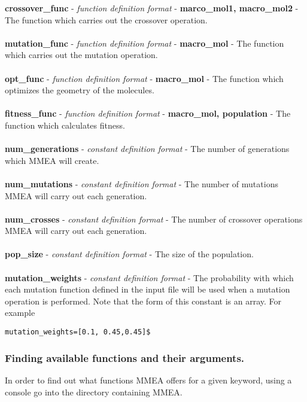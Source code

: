 \documentclass[12pt]{article}
\begin{document}
\textbf{crossover\_func} - \textit{function definition format} - \textbf{marco\_mol1, macro\_mol2} - The function which carries out the crossover operation.
\\
\\
\textbf{mutation\_func} - \textit{function definition format} - \textbf{macro\_mol} - The function which carries out the mutation operation.
\\
\\
\textbf{opt\_func} - \textit{function definition format} - \textbf{macro\_mol} - The function which optimizes the geometry of the molecules.
\\
\\
\textbf{fitness\_func} - \textit{function definition format} - \textbf{macro\_mol, population} - The function which calculates fitness.
\\
\\
\textbf{num\_generations} - \textit{constant definition format} - The number of generations which MMEA will create.
\\
\\
\textbf{num\_mutations} - \textit{constant definition format} - The number of mutations MMEA will carry out each generation.
\\
\\
\textbf{num\_crosses} - \textit{constant definition format} - The number of crossover operations MMEA will carry out each generation.
\\
\\
\textbf{pop\_size} - \textit{constant definition format} - The size of the population.
\\
\\
\textbf{mutation\_weights} - \textit{constant definition format} - The probability with which each mutation function defined in the input file will be used when a mutation operation is performed. Note that the form of this constant is an array. For example
\begin{verbatim}
mutation_weights=[0.1, 0.45,0.45]$
\end{verbatim}

\subsubsection{Finding available functions and their arguments.}
\label{Finding available functions and their arguments.}
In order to find out what functions MMEA offers for a given keyword, using a console go into the directory containing MMEA. 
\end{document}
